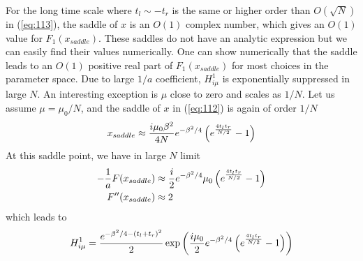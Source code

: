 \documentclass[11pt]{article}
\renewcommand{\>}{\rangle}
\newcommand{\<}{\langle}
\begin{document}
For the long time scale where $t_{l}\sim-t_{r}$ is the same or higher
order than $O(\sqrt{N})$ in (\ref{eq:113}), the saddle of $x$ is
an $O(1)$ complex number, which gives an $O(1)$ value for $F_{1}(x_{saddle})$.
These saddles do not have an analytic expression but we can easily
find their values numerically. One can show numerically that the saddle
leads to an $O(1)$ positive real part of $F_{1}(x_{saddle})$ for
most choices in the parameter space. Due to large $1/a$ coefficient,
$H_{i\mu}^{1}$ is exponentially suppressed in large $N$. An interesting
exception is $\mu$ close to zero and scales as $1/N$. Let us assume
$\mu=\mu_{0}/N$, and the saddle of $x$ in (\ref{eq:112}) is again
of order $1/N$ 
\begin{equation}
x_{saddle}\approx\frac{i\mu_{0}\beta^{2}}{4N}e^{-\beta^{2}/4}\left(e^{\frac{4t_{l}t_{r}}{N/2}}-1\right)
\end{equation}
At this saddle point, we have in large $N$ limit
\begin{align}
-\frac{1}{a}F(x_{saddle}) & \approx\frac{i}{2}e^{-\beta^{2}/4}\mu_{0}\left(e^{\frac{4t_{l}t_{r}}{N/2}}-1\right)\\
F''(x_{saddle}) & \approx2
\end{align}
which leads to
\begin{equation}
H_{i\mu}^{1}=\frac{e^{-\beta^{2}/4-(t_{l}+t_{r})^{2}}}{2}\exp\left(\frac{i\mu_{0}}{2}e^{-\beta^{2}/4}\left(e^{\frac{4t_{l}t_{r}}{N/2}}-1\right)\right)\label{eq:122-1}
\end{equation}
\end{document}
